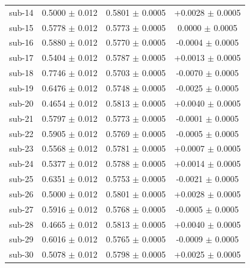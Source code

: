 \documentclass[preprint,12pt]{elsarticle}
\begin{document}
\begin{table}[!p]
\begin{tabular}{lccc}
sub-14 & 0.5000 $\pm$ 0.012 & 0.5801 $\pm$ 0.0005 & +0.0028 $\pm$ 0.0005 \\
sub-15 & 0.5778 $\pm$ 0.012 & 0.5773 $\pm$ 0.0005 & 0.0000 $\pm$ 0.0005 \\
sub-16 & 0.5880 $\pm$ 0.012 & 0.5770 $\pm$ 0.0005 & -0.0004 $\pm$ 0.0005 \\
sub-17 & 0.5404 $\pm$ 0.012 & 0.5787 $\pm$ 0.0005 & +0.0013 $\pm$ 0.0005 \\
sub-18 & 0.7746 $\pm$ 0.012 & 0.5703 $\pm$ 0.0005 & -0.0070 $\pm$ 0.0005 \\
sub-19 & 0.6476 $\pm$ 0.012 & 0.5748 $\pm$ 0.0005 & -0.0025 $\pm$ 0.0005 \\
sub-20 & 0.4654 $\pm$ 0.012 & 0.5813 $\pm$ 0.0005 & +0.0040 $\pm$ 0.0005 \\
sub-21 & 0.5797 $\pm$ 0.012 & 0.5773 $\pm$ 0.0005 & -0.0001 $\pm$ 0.0005 \\
sub-22 & 0.5905 $\pm$ 0.012 & 0.5769 $\pm$ 0.0005 & -0.0005 $\pm$ 0.0005 \\
sub-23 & 0.5568 $\pm$ 0.012 & 0.5781 $\pm$ 0.0005 & +0.0007 $\pm$ 0.0005 \\
sub-24 & 0.5377 $\pm$ 0.012 & 0.5788 $\pm$ 0.0005 & +0.0014 $\pm$ 0.0005 \\
sub-25 & 0.6351 $\pm$ 0.012 & 0.5753 $\pm$ 0.0005 & -0.0021 $\pm$ 0.0005 \\
sub-26 & 0.5000 $\pm$ 0.012 & 0.5801 $\pm$ 0.0005 & +0.0028 $\pm$ 0.0005 \\
sub-27 & 0.5916 $\pm$ 0.012 & 0.5768 $\pm$ 0.0005 & -0.0005 $\pm$ 0.0005 \\
sub-28 & 0.4665 $\pm$ 0.012 & 0.5813 $\pm$ 0.0005 & +0.0040 $\pm$ 0.0005 \\
sub-29 & 0.6016 $\pm$ 0.012 & 0.5765 $\pm$ 0.0005 & -0.0009 $\pm$ 0.0005 \\
sub-30 & 0.5078 $\pm$ 0.012 & 0.5798 $\pm$ 0.0005 & +0.0025 $\pm$ 0.0005 \\
\bottomrule
\end{tabular}
\end{table}
\end{document}
